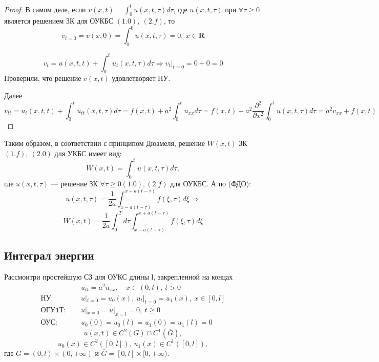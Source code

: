 \begin{proof}
	В самом деле, если $v(x, t) = \int_0^tu(x, t, \tau)d\tau$, где $u(x, t, \tau)$ при $\forall \tau \ge 0$ является решением ЗК для ОУКБС $(1.0),\ (2.f)$, то
	\[
		v_{t=0} = v(x, 0) = \int_0^0u(x, t, \tau) = 0,\ x \in \mathbf{R}
	\]

	\[
		v_t = u(x, t, t) + \int_0^tu_t(x, t, \tau) d\tau \Rightarrow v_t|_{t=0}=0+0=0
	\]
	Проверили, что решение $v(x, t)$ удовлетворяет НУ.

	Далее
	\[
		v_{tt} = u_t(x, t, t) + \int_0^t u_{tt}(x, t, \tau) d\tau = f(x, t) + a^2 \int_0^t u_{xx} d\tau = f(x, t) + a^2 \frac{\partial^2}{\partial x^2} \int_0^tu(x, t, \tau) d\tau = a^2v_{xx} + f(x, t)
	\]
\end{proof}

Таким образом, в соответствии с принципом Дюамеля, решение $W(x, t)$ ЗК $(1.f),\ (2.0)$ для УКБС имеет вид:
\[
	W(x, t) = \int_0^tu(x, t, \tau) d\tau,
\]где $u(x, t,\tau)$ --- решение ЗК $\forall \tau \ge 0 (1.0), (2.f)$ для ОУКБС. А по (ФДО):
\[
	u(x, t, \tau) = \frac{1}{2a} \int_{x-a(t-\tau)}^{x+a(t-\tau)} f(\xi, \tau) d\xi \Rightarrow
\]
\[
	W(x, t) = \frac{1}{2a}\int_0^T d\tau \int_{x-a(t-\tau)}^{x+a(t-\tau)} f(\xi, \tau) d\xi
\]

\subsection{Интеграл энергии}

Рассмоитри простейшую СЗ для ОУКС длины l, закрепленной на концах
\begin{align*}
	                       & u_{tt} = a^2 u_{xx}, \quad x \in (0,l),\ t > 0 \tag{1.0}      \\
	\textbf{НУ: } \quad    & u|_{t=0} = u_0(x),\ u_t|_{t=0} = u_1(x),\ x \in [0,l] \tag{2} \\
	\textbf{ОГУ1Т: } \quad & u|_{x=0} = u|_{x=l} = 0,\ t \ge 0 \tag{3.1.0}                 \\
	\textbf{ОУС: } \quad   & u_0(0) = u_0(l) = u_1(0) = u_1(l) = 0
\end{align*}
\[
	u(x, t) \in C^2(G) \cap C^1(\overline{G}),
\]
\[
	u_0(x) \in C^2([0, l]),\ u_1(x) \in C^1([0, l]),
\]
где $G=(0, l) \times (0, +\infty)$ и $\overline{G}=[0, l] \times [0, +\infty)$.

